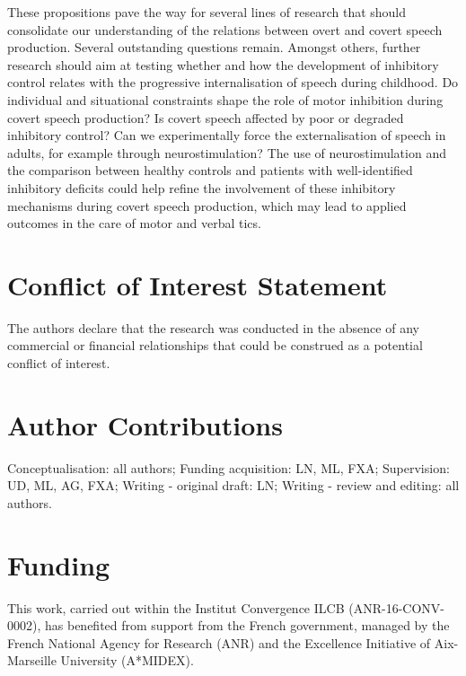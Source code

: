 \documentclass[utf8]{template/frontiersSCNS} %
\begin{document}
These propositions pave the way for several lines of research that should consolidate our understanding of the relations between overt and covert speech production. Several outstanding questions remain. Amongst others, further research should aim at testing whether and how the development of inhibitory control relates with the progressive internalisation of speech during childhood. Do individual and situational constraints shape the role of motor inhibition during covert speech production? Is covert speech affected by poor or degraded inhibitory control? Can we experimentally force the externalisation of speech in adults, for example through neurostimulation? The use of neurostimulation and the comparison between healthy controls and patients with well-identified inhibitory deficits could help refine the involvement of these inhibitory mechanisms during covert speech production, which may lead to applied outcomes in the care of motor and verbal tics.

\section*{Conflict of Interest Statement}

The authors declare that the research was conducted in the absence of any commercial or financial relationships that could be construed as a potential conflict of interest.

\section*{Author Contributions}

Conceptualisation: all authors; Funding acquisition: LN, ML, FXA; Supervision: UD, ML, AG, FXA; Writing - original draft: LN; Writing - review and editing: all authors.

\section*{Funding}

This work, carried out within the Institut Convergence ILCB (ANR-16-CONV-0002), has benefited from support from the French government, managed by the French National Agency for Research (ANR) and the Excellence Initiative of Aix-Marseille University (A*MIDEX).

\end{document}
